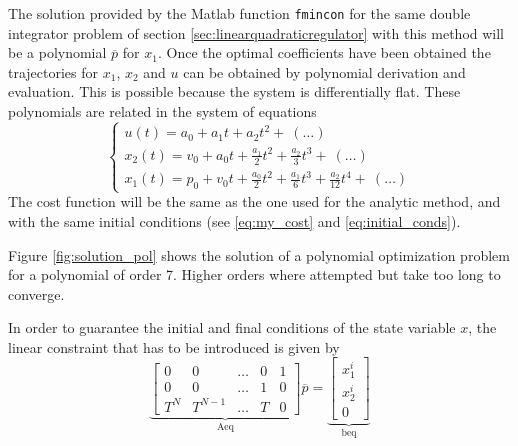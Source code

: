 \par The solution provided by the Matlab function \texttt{fmincon} for the same double integrator problem of section \ref{sec:linearquadraticregulator} with this method will be a polynomial $\overline{p}$ for $x_1$. Once the optimal coefficients have been obtained the trajectories for $x_1$, $x_2$ and $u$ can be obtained by polynomial derivation and evaluation. This is possible because the system is differentially flat. These polynomials are related in the system of equations
\begin{equation}
    \label{eq:polys_of_double_integrator}
    \begin{cases}
        u (t) = a_0 + a_1 t + a_2 t^2 + \ (\dots) \\
        x_2 (t) = v_0 + a_0 t + \frac{a_1}{2} t^2 + \frac{a_2}{3} t^3 + \ (\dots)  \\
        x_1 (t) = p_0 + v_0 t + \frac{a_0}{2} t^2 + \frac{a_1}{6} t^3 + \frac{a_2}{12} t^4 + \ (\dots)
    \end{cases}
\end{equation}
 The cost function will be the same as the one used for the analytic method, and with the same initial conditions (see \ref{eq:my_cost} and \ref{eq:initial_conds}).
\par Figure \ref{fig:solution_pol} shows the solution of a polynomial optimization problem for a polynomial of order 7. Higher orders where attempted but take too long to converge. %


\par In order to guarantee the initial and final conditions of the state variable $x$, the linear constraint that has to be introduced is given by
\begin{equation}
    \label{eq:pol_equality}
    \underbrace{\begin{bmatrix}
    0 & 0 & \dots & 0 & 1 \\
    0 & 0 & \dots & 1 & 0 \\
    T^N & T^{N-1} & \dots & T & 0 
    \end{bmatrix}}_\text{Aeq} \overline{p}  =
    \underbrace{\begin{bmatrix} x_1^i \\ x_2^i        \\ 0 \end{bmatrix}}_\text{beq}
\end{equation}


